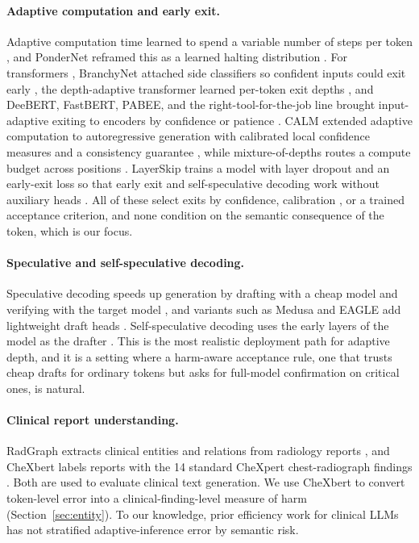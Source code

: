 \documentclass[11pt]{article}
\begin{document}
\paragraph{Adaptive computation and early exit.}
Adaptive computation time learned to spend a variable number of steps per token \cite{graves2016}, and
PonderNet reframed this as a learned halting distribution \cite{pondernet2021}. For transformers
\cite{vaswani2017}, BranchyNet attached side classifiers so confident inputs could exit early
\cite{branchynet}, the depth-adaptive transformer learned per-token exit depths \cite{depthadaptive2020},
and DeeBERT, FastBERT, PABEE, and the right-tool-for-the-job line brought input-adaptive exiting to
encoders by confidence or patience \cite{deebert,fastbert,pabee2020,righttool2020}. CALM extended
adaptive computation to autoregressive generation with calibrated local confidence measures and a
consistency guarantee \cite{calm}, while mixture-of-depths routes a compute budget across positions
\cite{mixtureofdepths2024}. LayerSkip trains a model with layer dropout and an early-exit loss so that
early exit and self-speculative decoding work without auxiliary heads \cite{layerskip}. All of these
select exits by confidence, calibration \cite{calibration2017}, or a trained acceptance criterion, and
none condition on the semantic consequence of the token, which is our focus.

\paragraph{Speculative and self-speculative decoding.}
Speculative decoding speeds up generation by drafting with a cheap model and verifying with the target
model \cite{speculative2023,specsampling2023}, and variants such as Medusa and EAGLE add lightweight
draft heads \cite{medusa2024,eagle2024}. Self-speculative decoding uses the early layers of the model
as the drafter \cite{layerskip}. This is the most realistic deployment path for adaptive depth, and it
is a setting where a harm-aware acceptance rule, one that trusts cheap drafts for ordinary tokens but
asks for full-model confirmation on critical ones, is natural.

\paragraph{Clinical report understanding.}
RadGraph extracts clinical entities and relations from radiology reports \cite{radgraph2021}, and
CheXbert \cite{chexbert} labels reports with the 14 standard CheXpert chest-radiograph findings
\cite{chexpert2019}. Both are used to evaluate clinical text generation. We use CheXbert to convert
token-level error into a clinical-finding-level measure of harm (Section~\ref{sec:entity}). To our
knowledge, prior efficiency work for clinical LLMs has not stratified adaptive-inference error by
semantic risk.
\end{document}
